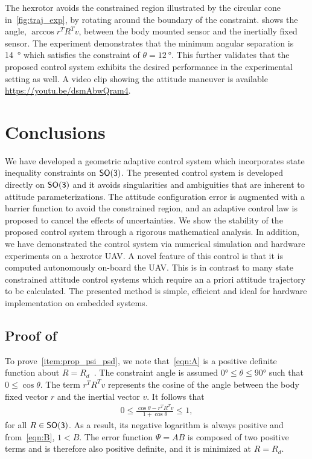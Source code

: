 \documentclass[fleqn]{IJCAS}  %
\begin{document}
\begin{multicols}{2}
The hexrotor avoids the constrained region illustrated by the circular cone in~\cref{fig:traj_exp}, by rotating around the boundary of the constraint. 
 shows the angle, \( \arccos r^T R^T v \), between the body mounted sensor and the inertially fixed sensor.
The experiment demonstrates that the minimum angular separation is \SI{14}{\degree} which satisfies the constraint of \( \theta = \SI{12}{\degree} \).
This further validates that the proposed control system exhibits the desired performance in the experimental setting as well. 
A video clip showing the attitude maneuver is available \url{https://youtu.be/dsmAbwQram4}.

\section{Conclusions}\label{sec:conclusions}
We have developed a geometric adaptive control system which incorporates state inequality constraints on \(\mathsf{SO(3)}\).
The presented control system is developed directly on \(\mathsf{SO(3)}\) and it avoids singularities and ambiguities that are inherent to attitude parameterizations.
The attitude configuration error is augmented with a barrier function to avoid the constrained region, and an adaptive control law is proposed to cancel the effects of uncertainties. 
We show the stability of the  proposed control system through a rigorous mathematical analysis.
In addition, we have demonstrated the control system via numerical simulation and hardware experiments on a hexrotor UAV.
A novel feature of this control is that it is computed autonomously on-board the UAV.
This is in contrast to many state constrained attitude control systems which require an a priori attitude trajectory to be calculated. 
The presented method is simple, efficient and ideal for hardware implementation on embedded systems.

\appendix
\subsection{Proof of~}\label{proof:config_error}
To prove~\cref{item:prop_psi_psd}, we note that~\cref{eqn:A} is a positive definite function about \( R = R_d \)~\cite{bullo2004}.
The constraint angle is assumed \( \ang{0} \leq \theta \leq \ang{90} \) such that \( 0 \leq \cos \theta \).
The term \( r^T R^T v \) represents the cosine of the angle between the body fixed vector \( r \) and the inertial vector \( v \). 
It follows that
\begin{align*}
	0 \leq  \frac{\cos \theta -  r^T R^T v}{1 + \cos \theta} \leq 1 ,
\end{align*}
for all \( R \in \mathsf{SO(3)} \). 
As a result, its negative logarithm is always positive and from~\cref{eqn:B}, \(1 < B\).
The error function \( \Psi = A B \) is composed of two positive terms and is therefore also positive definite, and it is minimized at \( R = R_d \).


\end{multicols}
\end{document}
